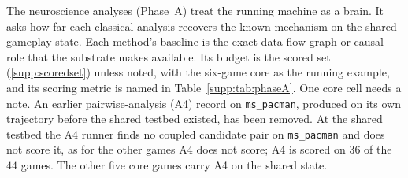 The neuroscience analyses (Phase~A) treat the running machine as a brain. It asks how far
each classical analysis recovers the known mechanism on the shared gameplay state. Each
method's baseline is the exact data-flow graph or causal role that the substrate makes
available. Its budget is the scored set (\Sectionname\ref{supp:scoredset}) unless noted,
with the six-game core as the running example, and its scoring metric is named in
Table~\ref{supp:tab:phaseA}. One core cell needs a note. An earlier pairwise-analysis (A4)
record on \texttt{ms\_pacman}, produced on its own trajectory before the shared testbed existed,
has been removed. At the shared testbed the A4 runner finds no coupled candidate pair on
\texttt{ms\_pacman} and does not score it, as for the other games A4 does not score; A4 is
scored on $36$ of the $44$ games. The other five core games carry A4 on the shared state.


